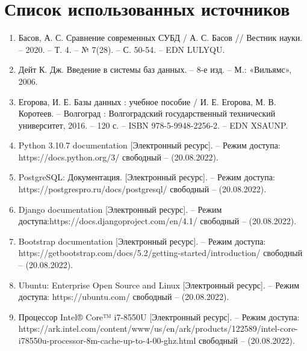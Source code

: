 \chapter*{Список использованных источников}

\renewcommand{\theenumi}{\arabic{enumi}}
\renewcommand{\labelenumi}{\theenumi.}

\begin{enumerate}
	\item Басов, А. С. Сравнение современных СУБД / А. С. Басов // Вестник науки. -- 2020. -- Т. 4. -- № 7(28). -- С. 50-54. -- EDN LULYQU.
	\item Дейт К. Дж. Введение в системы баз данных. -- 8-е изд. -- М.: «Вильямс», 2006.
	\item Егорова, И. Е. Базы данных : учебное пособие / И. Е. Егорова, М. В. Коротеев. -- Волгоград : Волгоградский государственный технический университет, 2016. -- 120 с. -- ISBN 978-5-9948-2256-2. -- EDN XSAUNP.
	\item Python 3.10.7 documentation [Электронный ресурс]. -- Режим доступа: https://docs.python.org/3/ свободный -- (20.08.2022).
	\item PostgreSQL: Документация. [Электронный ресурс]. -- Режим доступа: https://postgrespro.ru/docs/postgresql/ свободный -- (20.08.2022).
	\item Django documentation [Электронный ресурс]. -- Режим доступа:\newline https://docs.djangoproject.com/en/4.1/ свободный -- (20.08.2022).
	\item Bootstrap documentation [Электронный ресурс]. -- Режим доступа: \newline https://getbootstrap.com/docs/5.2/getting-started/introduction/ \newline свободный -- (20.08.2022).
	\item Ubuntu: Enterprise Open Source and Linux [Электронный ресурс]. -- Режим доступа: https://ubuntu.com/ свободный -- (20.08.2022).
	\item Процессор Intel® Core™ i7-8550U [Электронный ресурс]. -- Режим доступа: https://ark.intel.com/content/www/us/en/ark/products/122589/\newline intel-core-i78550u-processor-8m-cache-up-to-4-00-ghz.html \newline свободный -- (20.08.2022).
\end{enumerate}